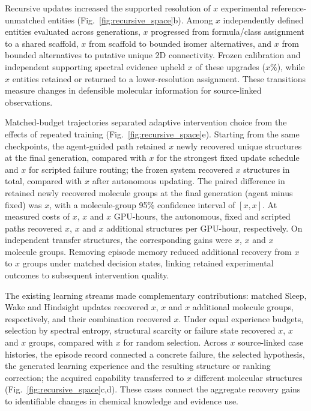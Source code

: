 \documentclass[11pt]{article}
\newcommand{\pending}[1]{\ensuremath{x}}
\begin{document}
Recursive updates increased the supported resolution of \(\pending{r3-16}\) experimental reference-unmatched entities (Fig.~\ref{fig:recursive_space}b). Among \(\pending{r3-17}\) independently defined entities evaluated across generations, \(\pending{r3-18}\) progressed from formula/class assignment to a shared scaffold, \(\pending{r3-19}\) from scaffold to bounded isomer alternatives, and \(\pending{r3-20}\) from bounded alternatives to putative unique 2D connectivity. Frozen calibration and independent supporting spectral evidence upheld \pending{dark-supported-upgrades} of these upgrades (\(\pending{r3-21}\%\)), while \(\pending{r3-22}\) entities retained or returned to a lower-resolution assignment. These transitions measure changes in defensible molecular information for source-linked observations.

Matched-budget trajectories separated adaptive intervention choice from the effects of repeated training (Fig.~\ref{fig:recursive_space}e). Starting from the same checkpoints, the agent-guided path retained \(\pending{r3-23}\) newly recovered unique structures at the final generation, compared with \(\pending{r3-24}\) for the strongest fixed update schedule and \(\pending{r3-25}\) for scripted failure routing; the frozen system recovered \(\pending{r3-26}\) structures in total, compared with \(\pending{r3-27}\) after autonomous updating. The paired difference in retained newly recovered molecule groups at the final generation (agent minus fixed) was \pending{rsi-gain-over-fixed}, with a molecule-group 95\% confidence interval of \([\pending{r3-28},\pending{r3-29}]\). At measured costs of \(\pending{r3-30}\), \(\pending{r3-31}\) and \(\pending{r3-32}\) GPU-hours, the autonomous, fixed and scripted paths recovered \(\pending{r3-33}\), \(\pending{r3-34}\) and \(\pending{r3-35}\) additional structures per GPU-hour, respectively. On independent transfer structures, the corresponding gains were \(\pending{r3-36}\), \(\pending{r3-37}\) and \(\pending{r3-38}\) molecule groups. Removing episode memory reduced additional recovery from \(\pending{r3-39}\) to \(\pending{r3-40}\) groups under matched decision states, linking retained experimental outcomes to subsequent intervention quality.

The existing learning streams made complementary contributions: matched Sleep, Wake and Hindsight updates recovered \(\pending{r3-41}\), \(\pending{r3-42}\) and \(\pending{r3-43}\) additional molecule groups, respectively, and their combination recovered \(\pending{r3-44}\). Under equal experience budgets, selection by spectral entropy, structural scarcity or failure state recovered \(\pending{r3-45}\), \(\pending{r3-46}\) and \(\pending{r3-47}\) groups, compared with \(\pending{r3-48}\) for random selection. Across \(\pending{r3-49}\) source-linked case histories, the episode record connected a concrete failure, the selected hypothesis, the generated learning experience and the resulting structure or ranking correction; the acquired capability transferred to \(\pending{r3-50}\) different molecular structures (Fig.~\ref{fig:recursive_space}c,d). These cases connect the aggregate recovery gains to identifiable changes in chemical knowledge and evidence use.
\end{document}
